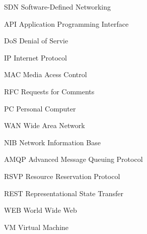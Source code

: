 
\begin{siglas}
    \item[SDN]{Software-Defined Networking}
	\item[API]{Application Programming Interface}
	\item[DoS]{Denial of Servie}
	\item[IP]{Internet Protocol}
	\item[MAC]{Media Acess Control}
	\item[RFC]{Requests for Comments}
	\item[PC]{Personal Computer}
	\item[WAN]{Wide Area Network}
	\item[NIB]{Network Information Base}
	\item[AMQP]{Advanced Message Queuing Protocol}
	\item[RSVP]{Resource Reservation Protocol}
	\item[REST]{Representational State Transfer}
	\item[WEB]{World Wide Web}
	\item[VM]{Virtual Machine}

\end{siglas}
